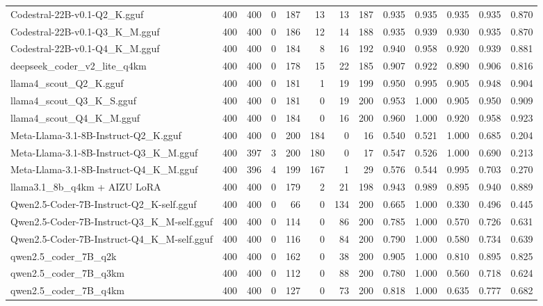\begin{table}[htbp]
{\begin{tabular}{lrrrrrrrrrrrr}
    Codestral-22B-v0.1-Q2\_K.gguf & 400 & 400 & 0 & 187 & 13 & 13 & 187 & 0.935 & 0.935 & 0.935 & 0.935 & 0.870 \\
    Codestral-22B-v0.1-Q3\_K\_M.gguf & 400 & 400 & 0 & 186 & 12 & 14 & 188 & 0.935 & 0.939 & 0.930 & 0.935 & 0.870 \\
    Codestral-22B-v0.1-Q4\_K\_M.gguf & 400 & 400 & 0 & 184 & 8 & 16 & 192 & 0.940 & 0.958 & 0.920 & 0.939 & 0.881 \\
    deepseek\_coder\_v2\_lite\_q4km & 400 & 400 & 0 & 178 & 15 & 22 & 185 & 0.907 & 0.922 & 0.890 & 0.906 & 0.816 \\
    llama4\_scout\_Q2\_K.gguf & 400 & 400 & 0 & 181 & 1 & 19 & 199 & 0.950 & 0.995 & 0.905 & 0.948 & 0.904 \\
    llama4\_scout\_Q3\_K\_S.gguf & 400 & 400 & 0 & 181 & 0 & 19 & 200 & 0.953 & 1.000 & 0.905 & 0.950 & 0.909 \\
    llama4\_scout\_Q4\_K\_M.gguf & 400 & 400 & 0 & 184 & 0 & 16 & 200 & 0.960 & 1.000 & 0.920 & 0.958 & 0.923 \\
    Meta-Llama-3.1-8B-Instruct-Q2\_K.gguf & 400 & 400 & 0 & 200 & 184 & 0 & 16 & 0.540 & 0.521 & 1.000 & 0.685 & 0.204 \\
    Meta-Llama-3.1-8B-Instruct-Q3\_K\_M.gguf & 400 & 397 & 3 & 200 & 180 & 0 & 17 & 0.547 & 0.526 & 1.000 & 0.690 & 0.213 \\
    Meta-Llama-3.1-8B-Instruct-Q4\_K\_M.gguf & 400 & 396 & 4 & 199 & 167 & 1 & 29 & 0.576 & 0.544 & 0.995 & 0.703 & 0.270 \\
    llama3.1\_8b\_q4km + AIZU LoRA & 400 & 400 & 0 & 179 & 2 & 21 & 198 & 0.943 & 0.989 & 0.895 & 0.940 & 0.889 \\
    Qwen2.5-Coder-7B-Instruct-Q2\_K-self.gguf & 400 & 400 & 0 & 66 & 0 & 134 & 200 & 0.665 & 1.000 & 0.330 & 0.496 & 0.445 \\
    Qwen2.5-Coder-7B-Instruct-Q3\_K\_M-self.gguf & 400 & 400 & 0 & 114 & 0 & 86 & 200 & 0.785 & 1.000 & 0.570 & 0.726 & 0.631 \\
    Qwen2.5-Coder-7B-Instruct-Q4\_K\_M-self.gguf & 400 & 400 & 0 & 116 & 0 & 84 & 200 & 0.790 & 1.000 & 0.580 & 0.734 & 0.639 \\
    qwen2.5\_coder\_7B\_q2k & 400 & 400 & 0 & 162 & 0 & 38 & 200 & 0.905 & 1.000 & 0.810 & 0.895 & 0.825 \\
    qwen2.5\_coder\_7B\_q3km & 400 & 400 & 0 & 112 & 0 & 88 & 200 & 0.780 & 1.000 & 0.560 & 0.718 & 0.624 \\
    qwen2.5\_coder\_7B\_q4km & 400 & 400 & 0 & 127 & 0 & 73 & 200 & 0.818 & 1.000 & 0.635 & 0.777 & 0.682 \\

\end{tabular}}
\end{table}

